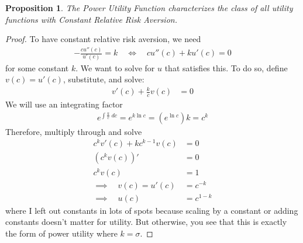 \documentclass[12pt]{article}
\theoremstyle{plain}
\newtheorem{prop}[thm]{Proposition}
\theoremstyle{definition}
\theoremstyle{remark}
\begin{document}
\begin{prop}
The Power Utility Function characterizes the class of all utility
functions with Constant Relative Risk Aversion.
\end{prop}
\begin{proof}
To have constant relative risk aversion, we need
\begin{align*}
  -\frac{cu''(c)}{u'(c)} = k
  \quad\iff\quad
  cu''(c) + ku'(c) = 0
\end{align*}
for some constant $k$. We want to solve for $u$ that satisfies this. To
do so, define $v(c)=u'(c)$, substitute, and solve:
\begin{align*}
  v'(c) + \frac{k}{c}v(c) &= 0
\end{align*}
We will use an integrating factor
\begin{align*}
  e^{\int \frac{k}{c} \; dc}=e^{k\ln c} = (e^{\ln c})k = c^k
\end{align*}
Therefore, multiply through and solve
\begin{align*}
  c^k v'(c) + kc^{k-1}v(c) &= 0 \\
  \left(c^k v(c)\right)' &= 0 \\
  c^k v(c) &= 1 \\
  \implies \quad v(c) = u'(c) &= c^{-k} \\
  \implies \quad u(c) &= c^{1-k}
\end{align*}
where I left out constants in lots of spots because scaling by a
constant or adding constants doesn't matter for utility. But otherwise,
you see that this is exactly the form of power utility where $k=\sigma$.
\end{proof}
\end{document}
